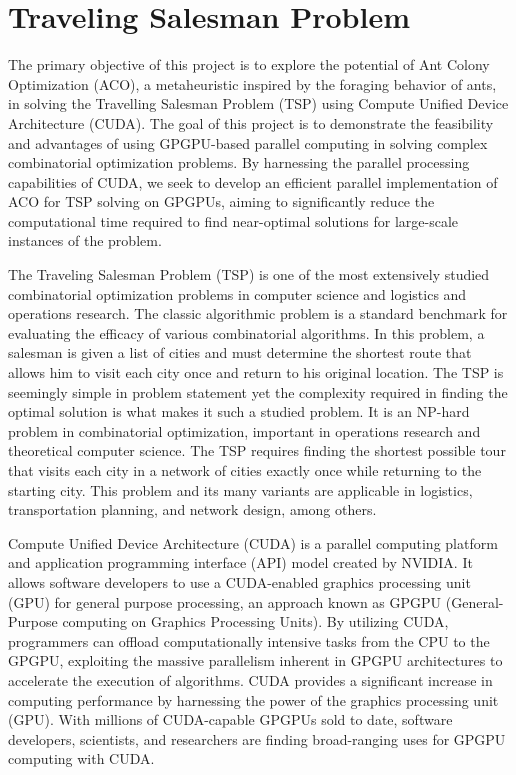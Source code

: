 \chapter{Traveling Salesman Problem}
\hypertarget{index}{}\label{index}
The primary objective of this project is to explore the potential of Ant Colony Optimization (ACO), a metaheuristic inspired by the foraging behavior of ants, in solving the Travelling Salesman Problem (TSP) using Compute Unified Device Architecture (CUDA). The goal of this project is to demonstrate the feasibility and advantages of using GPGPU-\/based parallel computing in solving complex combinatorial optimization problems. By harnessing the parallel processing capabilities of CUDA, we seek to develop an efficient parallel implementation of ACO for TSP solving on GPGPUs, aiming to significantly reduce the computational time required to find near-\/optimal solutions for large-\/scale instances of the problem.

The Traveling Salesman Problem (TSP) is one of the most extensively studied combinatorial optimization problems in computer science and logistics and operations research. The classic algorithmic problem is a standard benchmark for evaluating the efficacy of various combinatorial algorithms. In this problem, a salesman is given a list of cities and must determine the shortest route that allows him to visit each city once and return to his original location. The TSP is seemingly simple in problem statement yet the complexity required in finding the optimal solution is what makes it such a studied problem. It is an NP-\/hard problem in combinatorial optimization, important in operations research and theoretical computer science. The TSP requires finding the shortest possible tour that visits each city in a network of cities exactly once while returning to the starting city. This problem and its many variants are applicable in logistics, transportation planning, and network design, among others.

Compute Unified Device Architecture (CUDA) is a parallel computing platform and application programming interface (API) model created by NVIDIA. It allows software developers to use a CUDA-\/enabled graphics processing unit (GPU) for general purpose processing, an approach known as GPGPU (General-\/\+Purpose computing on Graphics Processing Units). By utilizing CUDA, programmers can offload computationally intensive tasks from the CPU to the GPGPU, exploiting the massive parallelism inherent in GPGPU architectures to accelerate the execution of algorithms. CUDA provides a significant increase in computing performance by harnessing the power of the graphics processing unit (GPU). With millions of CUDA-\/capable GPGPUs sold to date, software developers, scientists, and researchers are finding broad-\/ranging uses for GPGPU computing with CUDA.

